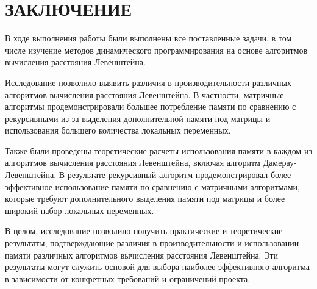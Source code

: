 \chapter*{ЗАКЛЮЧЕНИЕ}

В ходе выполнения работы были выполнены все поставленные задачи, в том числе изучение методов динамического программирования на основе алгоритмов вычисления расстояния Левенштейна.

Исследование позволило выявить различия в производительности различных алгоритмов вычисления расстояния Левенштейна. В частности, матричные алгоритмы продемонстрировали большее потребление памяти по сравнению с рекурсивными из-за выделения дополнительной памяти под матрицы и использования большего количества локальных переменных.

Также были проведены теоретические расчеты использования памяти в каждом из алгоритмов вычисления расстояния Левенштейна, включая алгоритм Дамерау-Левенштейна. В результате рекурсивный алгоритм продемонстрировал более эффективное использование памяти по сравнению с матричными алгоритмами, которые требуют дополнительного выделения памяти под матрицы и более широкий набор локальных переменных.

В целом, исследование позволило получить практические и теоретические результаты, подтверждающие различия в производительности и использовании памяти различных алгоритмов вычисления расстояния Левенштейна. Эти результаты могут служить основой для выбора наиболее эффективного алгоритма в зависимости от конкретных требований и ограничений проекта.
\pagebreak